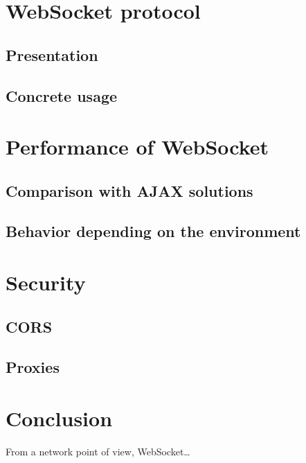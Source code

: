 \documentclass[journal,compsoc]{IEEEtran}
\newcommand{\ws}{WebSocket}
\begin{document}
\section{\ws{} protocol}



\subsection{Presentation}

\subsection{Concrete usage}

\section{Performance of \ws}

\subsection{Comparison with AJAX solutions}

\subsection{Behavior depending on the environment}

\section{Security}

\subsection{CORS}

\subsection{Proxies}

\section{Conclusion}

From a network point of view, \ws …


\ifCLASSOPTIONcaptionsoff
  \newpage
\fi




\end{document}
